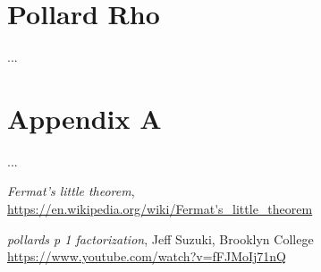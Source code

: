 \documentclass[10pt]{article}
\begin{document}
\section{Pollard Rho}
...


























\newpage
\section*{Appendix A}
...
\newpage
\begin{thebibliography}{9}
	\textit{Fermat's little theorem},\\
	\url{https://en.wikipedia.org/wiki/Fermat's_little_theorem}
	
	\textit{pollards p 1 factorization}, Jeff Suzuki, Brooklyn College\\
	\url{https://www.youtube.com/watch?v=fFJMoIj71nQ}
\end{thebibliography}
\end{document}
